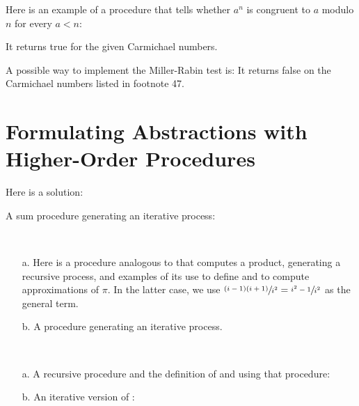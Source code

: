 \begin{exe}[1.27]
    Here is an example of a procedure that tells whether $a^n$ is congruent to 
    $a$ modulo $n$ for every $a < n$:

    It returns true for the given Carmichael numbers.
\end{exe}

\begin{exe}[1.28]
    A possible way to implement the Miller-Rabin test is:
    It returns false on the Carmichael numbers listed in footnote 47.
\end{exe}

\section{Formulating Abstractions with Higher-Order Procedures}

\begin{exe}[1.29]
    Here is a solution:
\end{exe}

\begin{exe}[1.30]
    A sum procedure generating an iterative process:
\end{exe}

\begin{exe}[1.31]
    \ \vspace{-20pt}
    \begin{itemize}
        \item[a.] Here is a procedure analogous to  that computes 
            a product, generating a recursive process, and examples of its use 
            to define  and to compute approximations of $\pi$. 
            In the latter case, we use $\sfrac{(i - 1)(i + 1)}{i^2} = \sfrac{i^2 
            - 1}{i^2}$ as the general term.
        \item[b.] A  procedure generating an iterative process.
    \end{itemize}
\end{exe}

\begin{exe}[1.32]
    \ \vspace{-20pt}
    \begin{itemize}
        \item[a.] A recursive  procedure and the definition of 
             and  using that procedure:
        \item[b.] An iterative version of :
    \end{itemize}
\end{exe}

